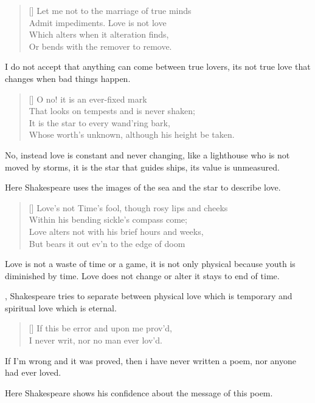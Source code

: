 \documentclass[12pt, a4paper]{article}
\begin{document}
\settowidth{\versewidth}{Let me not to the marriage of true minds}
\begin{verse}[\versewidth]
{\fontverse
Let me not to the marriage of true minds \\
Admit impediments. Love is not love \\
Which alters when it alteration finds,\\ 
Or bends with the remover to remove.
}
\end{verse}
{\fontpar
I do not accept that anything can come between 
true lovers, its not true love that changes when bad things
happen.
}
\begin{verse}[\versewidth]
{\fontverse
O no! it is an ever-fixed mark\\
That looks on tempests and is never shaken;\\
It is the star to every wand'ring bark,\\
Whose worth's unknown, although his height be taken.
}
\end{verse}
{\fontpar
No, instead love is constant and never changing,
like a lighthouse who is not moved by storms,
it is the star that guides ships, its value 
is unmeasured.\medbreak

Here Shakespeare uses the images of the sea and the star
to describe love.
}
\begin{verse}[\versewidth]
{\fontverse
Love's not Time's fool, though rosy lips and cheeks\\
Within his bending sickle's compass come; \\
Love alters not with his brief hours and weeks,\\
But bears it out ev'n to the edge of doom
}
\end{verse}
{\fontpar
Love is not a waste of time or a game, it is not only physical
because youth is diminished by time. Love does not change or alter
it stays to end of time.\medbreak

, Shakespeare tries to separate between physical
love which is temporary and spiritual love which is eternal.
}
\begin{verse}[\versewidth]
{\fontverse
If this be error and upon me prov'd,\\
I never writ, nor no man ever lov'd.
}
\end{verse}
{\fontpar
If I'm wrong and it was proved, then i have 
never written a poem, nor anyone had ever loved.\medbreak

Here Shakespeare shows his confidence about the message of this 
poem.
}
\end{document}
